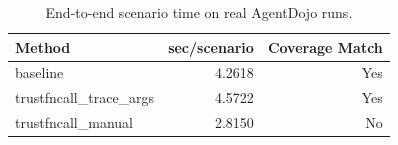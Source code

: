 \begin{table}[t]
\centering
\caption{End-to-end scenario time on real AgentDojo runs.}
\label{tab:system-end-to-end}
\small
\begin{tabular}{lrr}
\toprule
\textbf{Method} & \textbf{sec/scenario} & \textbf{Coverage Match} \\
\midrule
baseline & 4.2618 & Yes \\
trustfncall_trace_args & 4.5722 & Yes \\
trustfncall_manual & 2.8150 & No \\
\bottomrule
\end{tabular}
\end{table}
